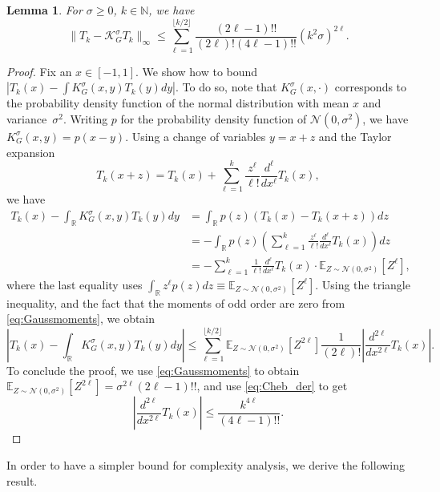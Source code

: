 \documentclass[11pt]{article}
\newcommand{\N}{\mathbb{N}}
\newcommand{\R}{\mathbb{R}}
\newtheorem{lemma}[defin]{Lemma}
\theoremstyle{definition}
\begin{document}
\begin{lemma}
\label{lem:Gaussian approximation Cheb basis}
    For $\sigma \geq 0$, $k \in \N$,  we have
    {
     \begin{equation*}
        \|T_k - \mathcal K_G^\sigma T_k \|_\infty \leq \sum_{\ell=1}^{\lfloor k/2\rfloor} \frac{(2\ell -1)!!}{(2\ell)!(4\ell -1)!!}(k^2 \sigma)^{2\ell}.
     \end{equation*}
     }
\end{lemma}
\begin{proof}
    Fix an $x \in [-1,1]$. We show how to bound $|T_k(x) - \int K_G^\sigma(x,y) T_k(y) dy|$. To do so, note that {$K_G^\sigma(x,\cdot)$} corresponds to the probability density function of the normal distribution with mean $x$ and variance~$\sigma^2$. Writing $p$ for the probability density function of $\mathcal N(0,\sigma^2)$, we have {$K_G^\sigma(x,y) = p(x-y)$}. Using a change of variables $y=x+z$
    and the Taylor expansion
{
\[
T_k(x+z) = T_k(x) + \sum_{\ell=1}^{k} \frac{z^\ell}{\ell !}\frac{d^{\ell}}{dx^{\ell}} T_k(x),
\]
we have
    \begin{align*}
    T_k(x) - \int_{\R} K_G^\sigma(x,y) T_k(y) dy &= \int_{\R} p(z) \left(T_k(x)- T_k(x+z)\right) dz \\
    &= -\int_{\mathbb{R}}  p(z) \left( \sum_{\ell=1}^{k} \frac{z^\ell}{\ell !} \frac{d^{\ell}}{dx^{\ell}} T_k(x) \right) dz \\
    &= -\sum_{\ell=1}^{k} \frac{1}{\ell !}\frac{d^{\ell}}{dx^{\ell}} T_k(x) \cdot \mathbb E_{Z \sim \mathcal N(0,\sigma^2)}[Z^{\ell}],
\end{align*}
where the last equality uses $\int_{\mathbb{R}}  z^\ell p(z)dz \equiv \mathbb E_{Z \sim \mathcal N(0,\sigma^2)}[Z^{\ell}]$.
}
 Using the triangle inequality, {and the fact that the moments of odd order are zero from \eqref{eq:Gaussmoments}}, we obtain
\[
\left|T_k(x) - \int_{\R} K_G^\sigma(x,y) T_k(y) dy\right| \leq \sum_{\ell=1}^{{\lfloor k/2\rfloor}} \mathbb E_{Z \sim \mathcal N(0,\sigma^2)}[Z^{2\ell}]  \frac{1}{(2\ell) !}\left| \frac{d^{2\ell}}{dx^{2\ell}} T_k(x) \right|.
\]
To conclude the proof, we use \eqref{eq:Gaussmoments} to obtain {${\mathbb E}_{Z \sim {\mathcal N}(0,\sigma^2)}[Z^{2\ell}] = \sigma^{2\ell}(2\ell-1)!!$}, and use \cref{eq:Cheb_der} to
get
\[
 \left|\frac{d^{2\ell}}{dx^{2\ell}} T_k(x) \right| \le  \frac{k^{4\ell}}{(4\ell -1)!!}.
 \]
\end{proof}



In order to have a simpler bound for complexity analysis, we  derive the following result.
\end{document}
